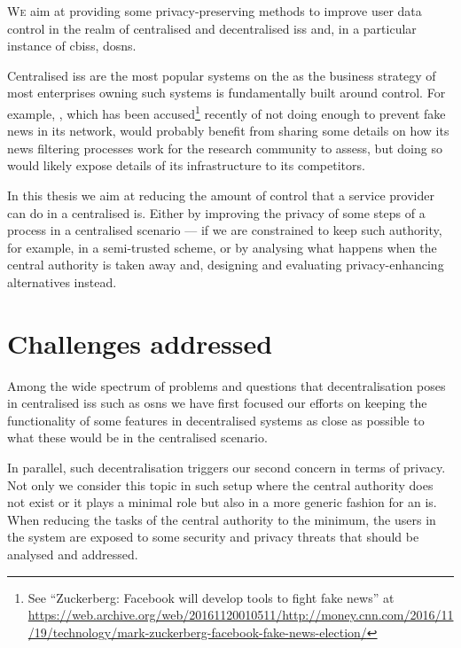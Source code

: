 \documentclass[showtrims,oldfontcommands]{kthesis}
\begin{document}
\lettrine{\textcolor[gray]{.25}{W}}{e} aim at providing some privacy-preserving 
methods to improve user data control in the realm of centralised and decentralised 
\acp{is} and, in a particular instance of \acp{cbis}, \acp{dosn}.

Centralised \acp{is} are the most popular systems on the \Internet as the business 
strategy of most enterprises owning such systems is fundamentally built around control. 
For example, \Facebook, which has been accused\footnote{See ``Zuckerberg: Facebook will develop tools to fight fake news'' at \url{https://web.archive.org/web/20161120010511/http://money.cnn.com/2016/11/19/technology/mark-zuckerberg-facebook-fake-news-election/}} 
recently of not doing enough to prevent fake news in its network, would probably 
benefit from sharing some details on how its news filtering processes work for the 
research community to assess, but doing so would likely expose details of its infrastructure 
to its competitors.

In this thesis we aim at reducing the amount of control that a service provider 
can do in a centralised \ac{is}. Either by improving the privacy of some steps of 
a process in a centralised scenario --- if we are constrained to keep such authority, 
for example, in a semi-trusted scheme, or by analysing what happens when the central 
authority is taken away and, designing and evaluating privacy-enhancing alternatives 
instead. 



\section{Challenges addressed}
    \label{section:challenges-addressed}
Among the wide spectrum of problems and questions that decentralisation poses in 
centralised \acp{is} such as \acp{osn} we have first focused our efforts on keeping 
the functionality of some features in decentralised systems as close as possible 
to what these would be in the centralised scenario.

In parallel, such decentralisation triggers our second concern in terms of privacy.
Not only we consider this topic in such setup where the central authority does not 
exist or it plays a minimal role but also in a more generic fashion for an \ac{is}. 
When reducing the tasks of the central authority to the minimum, the users in the 
system are exposed to some security and privacy threats that should be analysed 
and addressed.
\end{document}
